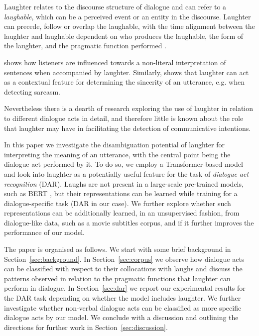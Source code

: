 \documentclass[11pt,a4paper]{article}
\begin{document}
Laughter relates to the discourse structure of dialogue
and can refer to a \emph{laughable}, which can be a perceived event or an
entity in the discourse.
Laughter can precede, follow or overlap the laughable, with the time
alignment between the laughter and laughable dependent on who produces
the laughable, the form of the laughter, and the pragmatic function performed \citep{tian2016we}. 

\citet{bryant2016laughter} shows how listeners are influenced towards a non-literal interpretation of sentences when accompanied by laughter. Similarly, \citet{tepperman2006yeah} shows that laughter can act as a contextual feature for determining the sincerity of an utterance, e.g. when detecting sarcasm. %

Nevertheless there is a dearth of research exploring the use of
laughter in relation to different dialogue acts in detail, and
therefore little is known about the role that laughter may have in
facilitating the detection of communicative intentions.

In this paper we investigate the disambiguation potential of laughter
for interpreting the meaning of an utterance, with the central point
being the dialogue act performed by it. To do so, we employ a
Transformer-based model and look into laughter as a potentially useful
feature for the task of \emph{dialogue act recognition} (DAR). Laughs are not
present in a large-scale pre-trained models, such as BERT \citep{Devlin2019a}, but their
representations can be learned while training for a dialogue-specific
task (DAR in our case). We further explore whether such representations
can be additionally learned, in an unsupervised fashion, from
dialogue-like data, such as a movie subtitles corpus, and if it
further improves the performance of our model. 


The paper is organised as follows. We start with some brief background
in Section~\ref{sec:background}. In Section~\ref{sec:corpus} we
observe how dialogue acts can be classified with respect to their
collocations with laughs and discuss the patterns observed in relation
to the pragmatic functions that laughter can perform in dialogue. In
Section~\ref{sec:dar} we report our experimental results for the DAR
task depending on whether the model includes laughter. We further
investigate whether non-verbal dialogue acts can be classified as more
specific dialogue acts by our model.  We conclude with a discussion and
outlining the directions for further work in
Section~\ref{sec:discussion}.
\end{document}
